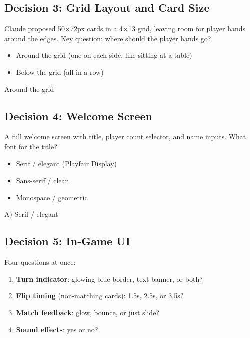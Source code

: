 \documentclass[11pt,a4paper]{article}
\begin{document}
\subsection{Decision 3: Grid Layout and Card Size}
Claude proposed 50\(\times\)72px cards in a 4\(\times\)13 grid, leaving room for player hands around the edges. Key question: where should the player hands go?

\begin{itemize}[leftmargin=1.5em]
  \item Around the grid (one on each side, like sitting at a table)
  \item Below the grid (all in a row)
\end{itemize}

\begin{tcolorbox}[promptbox]
Around the grid
\end{tcolorbox}

\subsection{Decision 4: Welcome Screen}
A full welcome screen with title, player count selector, and name inputs. What font for the title?

\begin{itemize}[leftmargin=1.5em]
  \item[A)] Serif / elegant (Playfair Display)
  \item[B)] Sans-serif / clean
  \item[C)] Monospace / geometric
\end{itemize}

\begin{tcolorbox}[promptbox]
A) Serif / elegant
\end{tcolorbox}

\subsection{Decision 5: In-Game UI}
Four questions at once:

\begin{enumerate}[leftmargin=1.5em]
  \item \textbf{Turn indicator}: glowing blue border, text banner, or both?
  \item \textbf{Flip timing} (non-matching cards): 1.5s, 2.5s, or 3.5s?
  \item \textbf{Match feedback}: glow, bounce, or just slide?
  \item \textbf{Sound effects}: yes or no?
\end{enumerate}
\end{document}

